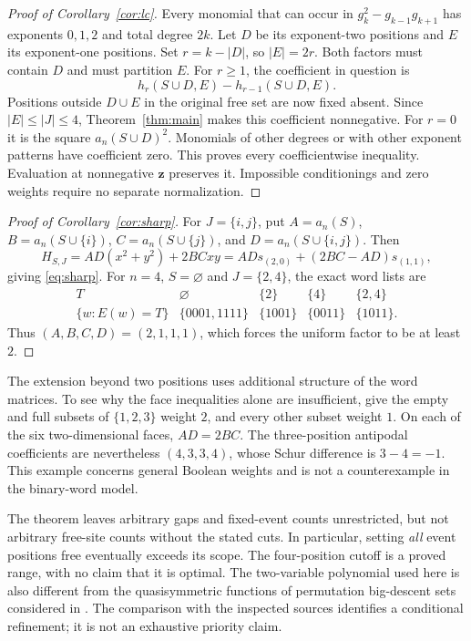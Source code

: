 \documentclass[11pt]{article}
\begin{document}
\begin{proof}[Proof of Corollary~\ref{cor:lc}]
Every monomial that can occur in $g_k^2-g_{k-1}g_{k+1}$ has exponents
$0,1,2$ and total degree $2k$. Let $D$ be its exponent-two positions
and $E$ its exponent-one positions. Set $r=k-|D|$, so $|E|=2r$.
Both factors must contain $D$ and must partition $E$.
For $r\ge1$, the coefficient in question is
\[
 h_r(S\cup D,E)-h_{r-1}(S\cup D,E).
\]
Positions outside $D\cup E$ in the original free set are now fixed absent.
Since $|E|\le |J|\le4$, Theorem~\ref{thm:main} makes this coefficient
nonnegative. For $r=0$ it is the square $a_n(S\cup D)^2$.
Monomials of other degrees or with other exponent patterns have coefficient
zero. This proves every coefficientwise inequality. Evaluation at
nonnegative $\boldsymbol z$ preserves it. Impossible conditionings and
zero weights require no separate normalization.
\end{proof}

\begin{proof}[Proof of Corollary~\ref{cor:sharp}]
For $J=\{i,j\}$, put
$A=a_n(S)$, $B=a_n(S\cup\{i\})$, $C=a_n(S\cup\{j\})$,
and $D=a_n(S\cup\{i,j\})$. Then
\[
 H_{S,J}=AD(x^2+y^2)+2BCxy
        =ADs_{(2,0)}+(2BC-AD)s_{(1,1)},
\]
giving \eqref{eq:sharp}. For $n=4$, $S=\varnothing$ and $J=\{2,4\}$,
the exact word lists are
\[
 \begin{array}{c|cccc}
 T&\varnothing&\{2\}&\{4\}&\{2,4\}\\\hline
 \{w:E(w)=T\}&\{0001,1111\}&\{1001\}&\{0011\}&\{1011\}.
 \end{array}
\]
Thus $(A,B,C,D)=(2,1,1,1)$, which forces the uniform factor to be at least $2$.
\end{proof}

The extension beyond two positions uses additional structure of the word
matrices. To see why the face inequalities alone are insufficient, give the
empty and full subsets of $\{1,2,3\}$ weight $2$, and every other subset
weight $1$. On each of the six two-dimensional faces, $AD=2BC$.
The three-position antipodal coefficients are nevertheless $(4,3,3,4)$,
whose Schur difference is $3-4=-1$. This example concerns general Boolean
weights and is not a counterexample in the binary-word model.

The theorem leaves arbitrary gaps and fixed-event counts unrestricted,
but not arbitrary free-site counts without the stated cuts.
In particular, setting \emph{all} event positions free eventually exceeds
its scope. The four-position cutoff is a proved range, with no claim that
it is optimal. The two-variable polynomial used here is also different
from the quasisymmetric functions of permutation big-descent sets considered
in \cite[Section~4.3]{ERZ}. The comparison with the inspected sources
identifies a conditional refinement; it is not an exhaustive priority claim.
\end{document}
